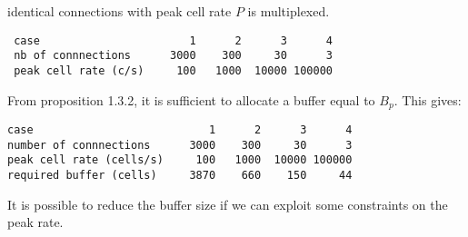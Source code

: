 \begin{problem}
\begin{enumerate}
                identical connections with peak cell rate $P$ is multiplexed.
                \begin{verbatim}
 case                       1      2      3      4
 nb of connnections      3000    300     30      3
 peak cell rate (c/s)     100   1000  10000 100000
            \end{verbatim}
\ifsol
From proposition 1.3.2, it is sufficient to allocate a buffer equal to
$B_{p}$. This gives:
\begin{verbatim}
case                           1      2      3      4
number of connnections      3000    300     30      3
peak cell rate (cells/s)     100   1000  10000 100000
required buffer (cells)     3870    660    150     44
\end{verbatim}
It is possible to reduce the buffer size if we can exploit some constraints on
the peak rate.
\fi
        \end{enumerate}

\end{problem}
